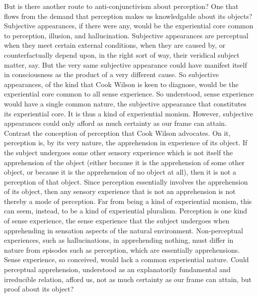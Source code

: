\documentclass[12pt]{article}
\begin{document}
But is there another route to anti-conjunctivism about perception? One that flows from the demand that perception makes us knowledgable about its objects? Subjective appearances, if there were any, would be the experiential core common to perception, illusion, and hallucination. Subjective appearances are perceptual when they meet certain external conditions, when they are caused by, or counterfactually depend upon, in the right sort of way, their veridical subject matter, say. But the very same subjective appearance could have manifest itself in consciousness as the product of a very different cause. So subjective appearances, of the kind that Cook Wilson is keen to diagnose, would be the experiential core common to all sense experience. So understood, sense experience would have a single common nature, the subjective appearance that constitutes its experiential core. It is thus a kind of experiential monism. However, subjective appearances could only afford as much certainty as our frame can attain. Contrast the conception of perception that Cook Wilson advocates. On it, perception is, by its very nature, the apprehension in experience of its object. If the subject undergoes some other sensory experience which is not itself the apprehension of the object (either because it is the apprehension of some other object, or because it is the apprehension of no object at all), then it is not a perception of that object. Since perception essentially involves the apprehension of its object, then any sensory experience that is not an apprehension is not thereby a mode of perception. Far from being a kind of experiential monism, this can seem, instead, to be a kind of experiential pluralism. Perception is one kind of sense experience, the sense experience that the subject undergoes when apprehending in sensation aspects of the natural environment. Non-perceptual experiences, such as hallucinations, in apprehending nothing, must differ in nature from episodes such as perception, which are essentially apprehensions. Sense experience, so conceived, would lack a common experiential nature. Could perceptual apprehension, understood as an explanatorily fundamental and irreducible relation, afford us, not as much certainty as our frame can attain, but proof about its object?
\end{document}
